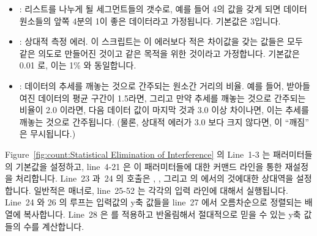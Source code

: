 \begin{itemize}
\item	{}: 리스트를 나누게 될 세그먼트들의 갯수로, 예를 들어 4의
	값을 갖게 되면 데이터 원소들의 앞쪽 4분의 1이 좋은 데이터라고
	가정됩니다.
	기본값은 3입니다.
\item	{}: 상대적 측정 에러.  이 스크립트는 이 에러보다 적은
	차이값을 갖는 값들은 모두 같은 의도로 만들어진 것이고 같은 목적을 위한
	것이라고 가정합니다.
	기본값은 0.01 로, 이는 1\% 와 동일합니다.
\item	{}: 데이터의 추세를 깨놓는 것으로 간주되는 원소간 거리의
	비율.
	예를 들어, 받아들여진 데이터의 평균 구간이 1.5라면, 그리고 만약 추세를
	깨놓는 것으로 간주되는 비율이 2.0 이라면, 다음 데이터 값이 마지막 것과
	3.0 이상 차이나면, 이는 추세를 깨놓는 것으로 간주됩니다.
	(물론, 상대적 에러가 3.0 보다 크지 않다면, 이 ``깨짐'' 은 무시됩니다.)

\end{itemize}

Figure~\ref{fig:count:Statistical Elimination of Interference} 의 Line~1-3 는
패러미터들의 기본값을 설정하고, line~4-21 은 이 패러미터들에 대한 커맨드 라인을
통한 재설정을 처리합니다.
Line~23 과~24 의  호출은 , , 그리고
 의  에서의 것에대한 상대역을 설정합니다.
일반적은  매너로, line~25-52 는 각각의 입력 라인에 대해서 실행됩니다.
Line~24 와 26 의 루프는 입력값의 y축 값들을 line~27 에서 오름차순으로 정렬되는
 배열에 복사합니다.
Line~28 은  를 적용하고 반올림해서 절대적으로 믿을 수 있는  y축
값들의 수를 계산합니다.
\iffalse

